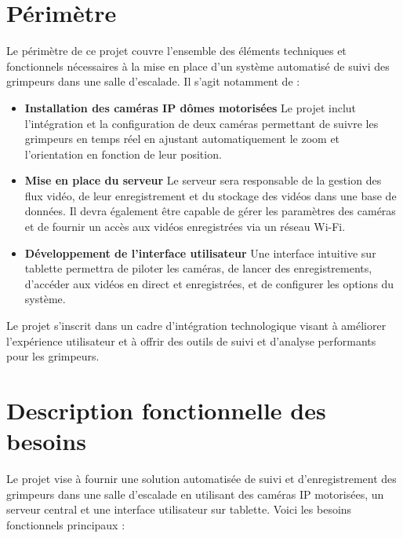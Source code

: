 \documentclass[a4paper, 11pt, french]{article}
\begin{document}
\section{Périmètre}

Le périmètre de ce projet couvre l'ensemble des éléments techniques et fonctionnels nécessaires à la mise en place d'un système automatisé de suivi des grimpeurs dans une salle d'escalade. Il s'agit notamment de :

\begin{itemize}
  \item \textbf{Installation des caméras IP dômes motorisées} Le projet inclut l'intégration et la configuration de deux caméras permettant de suivre les grimpeurs en temps réel en ajustant automatiquement le zoom et l'orientation en fonction de leur position.
  \item \textbf{Mise en place du serveur} Le serveur sera responsable de la gestion des flux vidéo, de leur enregistrement et du stockage des vidéos dans une base de données. Il devra également être capable de gérer les paramètres des caméras et de fournir un accès aux vidéos enregistrées via un réseau Wi-Fi.
  \item \textbf{Développement de l'interface utilisateur} Une interface intuitive sur tablette permettra de piloter les caméras, de lancer des enregistrements, d'accéder aux vidéos en direct et enregistrées, et de configurer les options du système.
\end{itemize}


Le projet s'inscrit dans un cadre d'intégration technologique visant à améliorer l’expérience utilisateur et à offrir des outils de suivi et d'analyse performants pour les grimpeurs.
  
\section{Description fonctionnelle des besoins}

Le projet vise à fournir une solution automatisée de suivi et d’enregistrement des grimpeurs dans une salle d'escalade en utilisant des caméras IP motorisées, un serveur central et une interface utilisateur sur tablette. Voici les besoins fonctionnels principaux :
\end{document}

